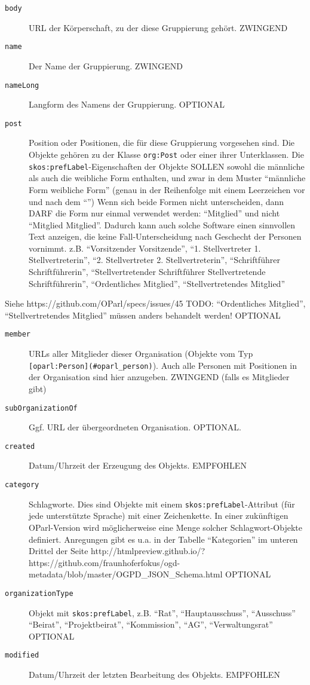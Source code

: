 \documentclass[,a4paper]{article}
\begin{document}
\begin{description}
\item[\texttt{body}]
URL der Körperschaft, zu der diese Gruppierung gehört. ZWINGEND
\item[\texttt{name}]
Der Name der Gruppierung. ZWINGEND
\item[\texttt{nameLong}]
Langform des Namens der Gruppierung. OPTIONAL
\item[\texttt{post}]
Position oder Positionen, die für diese Gruppierung vorgesehen sind. Die
Objekte gehören zu der Klasse \texttt{org:Post} oder einer ihrer
Unterklassen. Die \texttt{skos:prefLabel}-Eigenschaften der Objekte
SOLLEN sowohl die männliche als auch die weibliche Form enthalten, und
zwar in dem Muster ``männliche Form \textbar{} weibliche Form'' (genau
in der Reihenfolge mit einem Leerzeichen vor und nach dem
``\textbar{}'') Wenn sich beide Formen nicht unterscheiden, dann DARF
die Form nur einmal verwendet werden: ``Mitglied'' und nicht ``Mitglied
\textbar{} Mitglied''. Dadurch kann auch solche Software einen
sinnvollen Text anzeigen, die keine Fall-Unterscheidung nach Geschecht
der Personen vornimmt. z.B. ``Vorsitzender \textbar{} Vorsitzende'',
``1. Stellvertreter \textbar{} 1. Stellvertreterin'', ``2.
Stellvertreter \textbar{} 2. Stellvertreterin'', ``Schriftführer
\textbar{} Schriftführerin'', ``Stellvertretender Schriftführer
\textbar{} Stellvertretende Schriftführerin'', ``Ordentliches
Mitglied'', ``Stellvertretendes Mitglied''
\end{description}

Siehe https://github.com/OParl/specs/issues/45 TODO: ``Ordentliches
Mitglied'', ``Stellvertretendes Mitglied'' müssen anders behandelt
werden! OPTIONAL

\begin{description}
\item[\texttt{member}]
URLs aller Mitglieder dieser Organisation (Objekte vom Typ
\texttt{{[}oparl:Person{]}(\#oparl\_person)}). Auch alle Personen mit
Positionen in der Organisation sind hier anzugeben. ZWINGEND (falls es
Mitglieder gibt)
\item[\texttt{subOrganizationOf}]
Ggf. URL der übergeordneten Organisation. OPTIONAL.
\item[\texttt{created}]
Datum/Uhrzeit der Erzeugung des Objekts. EMPFOHLEN
\item[\texttt{category}]
Schlagworte. Dies sind Objekte mit einem
\texttt{skos:prefLabel}-Attribut (für jede unterstützte Sprache) mit
einer Zeichenkette. In einer zukünftigen OParl-Version wird
möglicherweise eine Menge solcher Schlagwort-Objekte definiert.
Anregungen gibt es u.a. in der Tabelle ``Kategorien'' im unteren Drittel
der Seite
http://htmlpreview.github.io/?https://github.com/fraunhoferfokus/ogd-metadata/blob/master/OGPD\_JSON\_Schema.html
OPTIONAL
\item[\texttt{organizationType}]
Objekt mit \texttt{skos:prefLabel}, z.B. ``Rat'', ``Hauptausschuss'',
``Ausschuss'' ``Beirat'', ``Projektbeirat'', ``Kommission'', ``AG'',
``Verwaltungsrat'' OPTIONAL
\item[\texttt{modified}]
Datum/Uhrzeit der letzten Bearbeitung des Objekts. EMPFOHLEN
\end{description}
\end{document}
